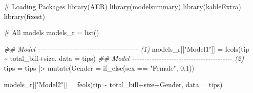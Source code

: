 \documentclass[
  letterpaper,
  DIV=11,
  numbers=noendperiod]{scrreprt}
\newenvironment{Shaded}{\begin{snugshade}}{\end{snugshade}}
\newcommand{\AttributeTok}[1]{\textcolor[rgb]{0.40,0.45,0.13}{#1}}
\newcommand{\CommentTok}[1]{\textcolor[rgb]{0.37,0.37,0.37}{#1}}
\newcommand{\DecValTok}[1]{\textcolor[rgb]{0.68,0.00,0.00}{#1}}
\newcommand{\DocumentationTok}[1]{\textcolor[rgb]{0.37,0.37,0.37}{\textit{#1}}}
\newcommand{\FunctionTok}[1]{\textcolor[rgb]{0.28,0.35,0.67}{#1}}
\newcommand{\NormalTok}[1]{\textcolor[rgb]{0.00,0.23,0.31}{#1}}
\newcommand{\OtherTok}[1]{\textcolor[rgb]{0.00,0.23,0.31}{#1}}
\newcommand{\SpecialCharTok}[1]{\textcolor[rgb]{0.37,0.37,0.37}{#1}}
\newcommand{\StringTok}[1]{\textcolor[rgb]{0.13,0.47,0.30}{#1}}
\begin{document}
\begin{Shaded}
\begin{Highlighting}[]
\CommentTok{\# Loading Packages }
\FunctionTok{library}\NormalTok{(AER)}
\FunctionTok{library}\NormalTok{(modelsummary)}
\FunctionTok{library}\NormalTok{(kableExtra)}
\FunctionTok{library}\NormalTok{(fixest)}
\end{Highlighting}
\end{Shaded}

\begin{Shaded}
\begin{Highlighting}[]
\CommentTok{\# All models }
\NormalTok{models\_r }\OtherTok{=} \FunctionTok{list}\NormalTok{()}

\DocumentationTok{\#\# Model {-}{-}{-}{-}{-}{-}{-}{-}{-}{-}{-}{-}{-}{-}{-}{-}{-}{-}{-}{-}{-}{-}{-}{-}{-}{-}{-}{-}{-}{-}{-}{-}{-}{-}{-}{-}{-}{-}{-}{-}{-} (1)}
\NormalTok{models\_r[[}\StringTok{"Model1"}\NormalTok{]] }\OtherTok{=} \FunctionTok{feols}\NormalTok{(tip }\SpecialCharTok{\textasciitilde{}}\NormalTok{ total\_bill}\SpecialCharTok{+}\NormalTok{size, }\AttributeTok{data =}\NormalTok{ tips)}
\DocumentationTok{\#\# Model {-}{-}{-}{-}{-}{-}{-}{-}{-}{-}{-}{-}{-}{-}{-}{-}{-}{-}{-}{-}{-}{-}{-}{-}{-}{-}{-}{-}{-}{-}{-}{-}{-}{-}{-}{-}{-}{-}{-}{-}{-} (2)}
\NormalTok{tips }\OtherTok{=}\NormalTok{ tips }\SpecialCharTok{|\textgreater{}} 
  \FunctionTok{mutate}\NormalTok{(}\AttributeTok{Gender =} \FunctionTok{if\_else}\NormalTok{(sex }\SpecialCharTok{==} \StringTok{"Female"}\NormalTok{, }\DecValTok{0}\NormalTok{,}\DecValTok{1}\NormalTok{)) }

\NormalTok{models\_r[[}\StringTok{"Model2"}\NormalTok{]] }\OtherTok{=} \FunctionTok{feols}\NormalTok{(tip }\SpecialCharTok{\textasciitilde{}}\NormalTok{ total\_bill}\SpecialCharTok{+}\NormalTok{size}\SpecialCharTok{+}\NormalTok{Gender, }\AttributeTok{data =}\NormalTok{ tips)}


\end{Highlighting}
\end{Shaded}
\end{document}

